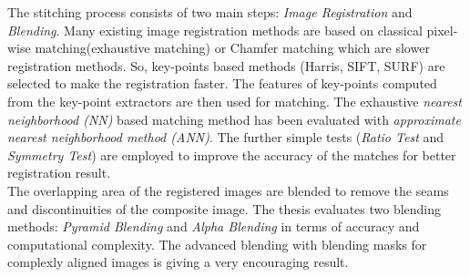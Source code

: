 \noindent The stitching process consists of two main steps: \emph{Image Registration} and \emph{Blending}. Many existing image registration methods are based on classical pixel-wise matching(exhaustive matching) or Chamfer matching which are slower registration methods. So, key-points based methods (Harris, SIFT, SURF) are selected to make the registration faster. The features of key-points computed from the key-point extractors are then used for matching. The exhaustive \emph{nearest neighborhood (NN)} based matching method has been evaluated with \emph{approximate nearest neighborhood method (ANN)}. The further simple tests (\emph{Ratio Test} and \emph{Symmetry Test}) are employed to improve the accuracy of the matches for better registration result.\\

\noindent The overlapping area of the registered images are blended to remove the seams and discontinuities of the composite image. The thesis evaluates two blending methods: \emph{Pyramid Blending} and \emph{Alpha Blending} in terms of accuracy and computational complexity. The advanced blending with blending masks for complexly aligned images is giving a very encouraging result.\\





